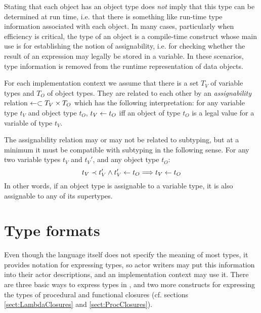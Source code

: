 \begin{implementation}
  Stating that each object has an object type does {\em not} imply
  that this type can be determined at run time, i.e. that there is
  something like run-time type information associated with each
  object. In many cases, particularly when efficiency is critical, the
  type of an object is a compile-time construct whose main use is for
  establishing the notion of assignability, i.e. for checking whether
  the result of an expression may legally be stored in a
  variable. In these scenarios, type information is removed from the
  runtime representation of data objects.
\end{implementation}

For each implementation context we assume that there is a set $T_V$ of
variable types and $T_O$ of object types.
They are related to each other by an {\em
  assignability} relation $\leftarrow \subset T_V \times T_O$
which has the following interpretation: for any variable type $t_V$
and object type $t_O$, $t_V \leftarrow t_O$ iff an object of type
$t_O$ is a legal value for a variable of type $t_V$.

The assignability relation may or may not be related to subtyping, but
at a minimum it must be compatible with subtyping in the following
sense. For any two variable types $t_V$ and $t_V'$, and any object
type $t_O$: \[ t_V \prec t_V' \wedge
t_V' \leftarrow t_O \Longrightarrow t_V \leftarrow t_O \] In
other words, if an object type is assignable to a variable type, it is
also assignable to any of its supertypes.


\section{Type formats}


Even though the \Cal language itself does not specify the meaning of
most types, it provides notation for expressing types, so actor
writers may put this information into their actor descriptions, and an
implementation context may use it. There are three basic ways to
express types in \Cal, and two more constructs for expressing the
types of procedural and functional closures (cf. sections
\ref{sect:LambdaClosures} and \ref{sect:ProcClosures}).


